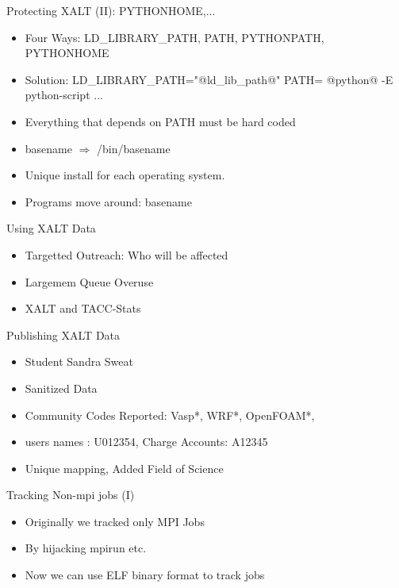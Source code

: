 \documentclass{beamer}
\begin{document}
\begin{frame}{Protecting XALT (II): PYTHONHOME,...}
  \begin{itemize}
    \item Four Ways: LD\_LIBRARY\_PATH, PATH, PYTHONPATH, PYTHONHOME
    \item Solution: LD\_LIBRARY\_PATH="@ld\_lib\_path@" PATH= @python@ -E
      python-script ...
    \item Everything that depends on PATH must be hard coded
    \item basename $\Rightarrow$ /bin/basename
    \item Unique install for each operating system.
    \item Programs move around: basename
  \end{itemize}
\end{frame}

\begin{frame}{Using XALT Data}
  \begin{itemize}
    \item Targetted Outreach: Who will be affected
    \item Largemem Queue Overuse
    \item XALT and TACC-Stats
  \end{itemize}
\end{frame}

\begin{frame}{Publishing XALT Data}
  \begin{itemize}
    \item Student Sandra Sweat
    \item Sanitized Data
    \item Community Codes Reported: Vasp*, WRF*, OpenFOAM*,
    \item users names : U012354, Charge Accounts: A12345
    \item Unique mapping, Added Field of Science
  \end{itemize}
\end{frame}

\begin{frame}{Tracking Non-mpi jobs (I)}
  \begin{itemize}
    \item Originally we tracked only MPI Jobs
    \item By hijacking mpirun etc.
    \item Now we can use ELF binary format to track jobs
  \end{itemize}
\end{frame}
\end{document}
